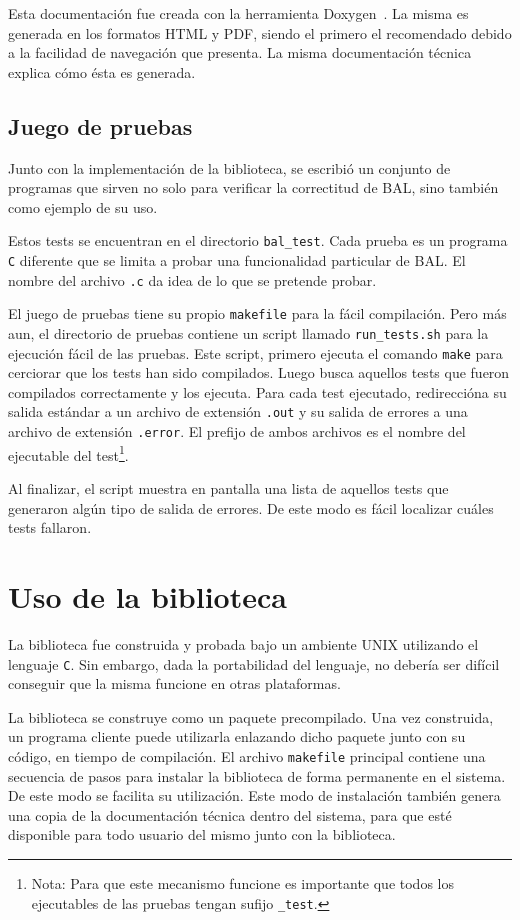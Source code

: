 \documentclass[a4paper,10pt]{article}
\begin{document}
Esta documentación fue creada con la herramienta Doxygen~\cite{doxygen}. La misma es generada en los formatos HTML y PDF, siendo el primero el recomendado debido a la facilidad de navegación que presenta.
 La misma documentación técnica explica cómo ésta es generada.

\subsection{Juego de pruebas}
Junto con la implementación de la biblioteca, se escribió un conjunto de programas que sirven no solo para verificar la correctitud de BAL, sino también como ejemplo de su uso.

Estos tests se encuentran en el directorio \texttt{bal\_test}. Cada prueba es un programa \texttt{C} diferente que se limita a probar una funcionalidad particular de BAL. El nombre del archivo \texttt{.c} da idea de lo que se pretende probar.

El juego de pruebas tiene su propio \texttt{makefile} para la fácil compilación. Pero más aun, el directorio de pruebas contiene un script llamado \texttt{run\_tests.sh} para la ejecución fácil de las pruebas. Este script, primero ejecuta el comando \texttt{make} para cerciorar que los tests han sido compilados. Luego busca aquellos tests que fueron compilados correctamente y los ejecuta. Para cada test ejecutado, redireccióna su salida estándar a un archivo de extensión \texttt{.out} y su salida de errores a una archivo de extensión \texttt{.error}. El prefijo de ambos archivos es el nombre del ejecutable del test\footnote{Nota: Para que este mecanismo funcione es importante que todos los ejecutables de las pruebas tengan sufijo \texttt{\_test}.}.

Al finalizar, el script muestra en pantalla una lista de aquellos tests que generaron algún tipo de salida  de errores. De este modo es fácil localizar cuáles tests fallaron.

\section{Uso de la biblioteca}
\label{sec_uso}
La biblioteca fue construida y probada bajo un ambiente UNIX utilizando el lenguaje \texttt{C}. Sin embargo, dada la portabilidad del lenguaje, no debería ser difícil conseguir que la misma funcione en otras plataformas.

La biblioteca se construye como un paquete precompilado. Una vez construida, un programa cliente puede utilizarla enlazando dicho paquete junto con su código, en tiempo de compilación.
El archivo \texttt{makefile} principal contiene una secuencia de pasos para instalar la biblioteca de forma permanente en el sistema. De este modo se facilita su utilización. Este modo de instalación también genera una copia de la documentación técnica dentro del sistema, para que esté disponible para todo usuario del mismo junto con la biblioteca.
\end{document}
